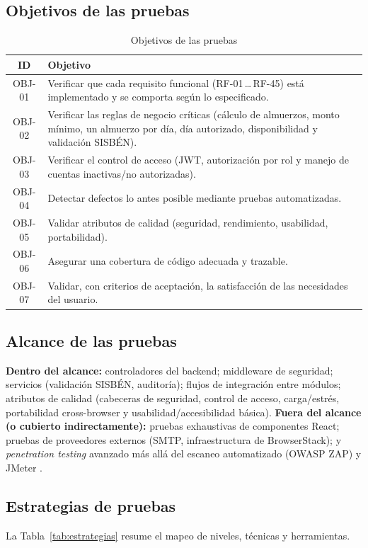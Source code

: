 \documentclass[stu,11pt,floatsintext]{apa7}
\begin{document}
\subsection{Objetivos de las pruebas}
\begin{table}[H]
\centering
\caption{Objetivos de las pruebas}
\label{tab:objetivos}
\begin{tabularx}{\textwidth}{c X}
\toprule
\textbf{ID} & \textbf{Objetivo} \\
\midrule
OBJ-01 & Verificar que cada requisito funcional (RF-01\,\ldots\,RF-45) está implementado y se comporta según lo especificado. \\
OBJ-02 & Verificar las reglas de negocio críticas (cálculo de almuerzos, monto mínimo, un almuerzo por día, día autorizado, disponibilidad y validación SISBÉN). \\
OBJ-03 & Verificar el control de acceso (JWT, autorización por rol y manejo de cuentas inactivas/no autorizadas). \\
OBJ-04 & Detectar defectos lo antes posible mediante pruebas automatizadas. \\
OBJ-05 & Validar atributos de calidad (seguridad, rendimiento, usabilidad, portabilidad). \\
OBJ-06 & Asegurar una cobertura de código adecuada y trazable. \\
OBJ-07 & Validar, con criterios de aceptación, la satisfacción de las necesidades del usuario. \\
\bottomrule
\end{tabularx}
\end{table}

\subsection{Alcance de las pruebas}
\textbf{Dentro del alcance:} controladores del backend; middleware de seguridad;
servicios (validación SISBÉN, auditoría); flujos de integración entre módulos; atributos
de calidad (cabeceras de seguridad, control de acceso, carga/estrés, portabilidad
cross-browser y usabilidad/accesibilidad básica). \textbf{Fuera del alcance (o cubierto
indirectamente):} pruebas exhaustivas de componentes React; pruebas de proveedores
externos (SMTP, infraestructura de BrowserStack); y \emph{penetration testing} avanzado
más allá del escaneo automatizado (OWASP ZAP) y JMeter \parencite{owasp2021}.

\subsection{Estrategias de pruebas}
La Tabla~\ref{tab:estrategias} resume el mapeo de niveles, técnicas y herramientas.
\end{document}
